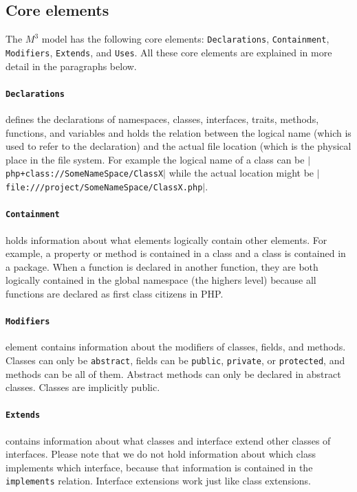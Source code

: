 \documentclass[../main.tex]{subfiles}
\begin{document}
    \subsection{Core elements}
    The $M^3$ model has the following core elements: \texttt{Declarations}, \texttt{Containment}, \texttt{Modifiers}, \texttt{Extends}, and \texttt{Uses}.
    All these core elements are explained in more detail in the paragraphs below.
    
    \paragraph{\texttt{Declarations}} defines the declarations of namespaces, classes, interfaces, traits, methods, functions, and variables and holds the relation between the logical name (which is used to refer to the declaration) and the actual file location (which is the physical place in the file system.
    For example the logical name of a class can be \texttt{$\vert$php+class://SomeNameSpace/ClassX$\vert$} while the actual location might be \texttt{$\vert$file:///project/SomeNameSpace/ClassX.php$\vert$}.
    
    \paragraph{\texttt{Containment}} holds information about what elements logically contain other elements.
    For example, a property or method is contained in a class and a class is contained in a package.
    When a function is declared in another function, they are both logically contained in the global namespace (the highers level) because all functions are declared as first class citizens in PHP.
    
    \paragraph{\texttt{Modifiers}} element contains information about the modifiers of classes, fields, and methods. 
    Classes can only be \texttt{abstract}, fields can be \texttt{public}, \texttt{private}, or \texttt{protected}, and methods can be all of them. 
    Abstract methods can only be declared in abstract classes. 
    Classes are implicitly public.
    
    \paragraph{\texttt{Extends}} contains information about what classes and interface extend other classes of interfaces. 
    Please note that we do not hold information about which class implements which interface, because that information is contained in the \texttt{implements} relation.
    Interface extensions work just like class extensions.
    
\end{document}
